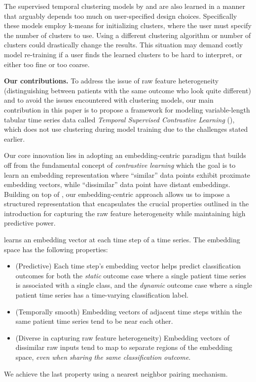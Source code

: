 The supervised temporal clustering models by \citet{lee2020temporal} and \citet{aguiar2022learning} are also learned in a manner that arguably depends too much on user-specified design choices.
Specifically these models employ k-means for initializing clusters, where the user must specify the number of clusters to use.
Using a different clustering algorithm or number of clusters could drastically change the results.
This situation may demand costly model re-training if a user finds the learned clusters to be hard to interpret, or either too fine or too coarse.


\noindent
\textbf{Our contributions.}
To address the issue of raw feature heterogeneity (distinguishing between patients with the same outcome who look quite different) and to avoid the issues encountered with clustering models, our main contribution in this paper is to propose a framework for modeling variable-length tabular time series data called \emph{Temporal Supervised Contrastive Learning} (\mbox{}), which does not use clustering during model training due to the challenges stated earlier. 

Our core innovation lies in adopting an embedding-centric paradigm that builds off from the fundamental concept of \emph{contrastive learning} \citep{le2020contrastive} which the goal is to learn an embedding representation where ``similar'' data points exhibit proximate embedding vectors, while ``dissimilar'' data point have distant embeddings.
Building on top of \cite{khosla2020supervised}, our embedding-centric approach allows us to impose a structured representation that encapsulates the crucial properties outlined in the introduction for capturing the raw feature heterogeneity while maintaining high predictive power.

 learns an embedding vector at each time step of a time series. The embedding space has the following properties:
\begin{itemize}
\item[$\bullet$] (Predictive) Each time step's embedding vector helps predict classification outcomes for both the \emph{static} outcome case where a single patient time series is associated with a single class, and the \emph{dynamic} outcome case where a single patient time series has a time-varying classification label.
\item[$\bullet$] (Temporally smooth) Embedding vectors of adjacent time steps within the same patient time series tend to be near each other.
\item[$\bullet$] (Diverse in capturing raw feature heterogeneity) Embedding vectors of dissimilar raw inputs tend to map to separate regions of the embedding space, \emph{even when sharing the same classification outcome}.
\end{itemize}
We achieve the last property using a nearest neighbor pairing mechanism.

